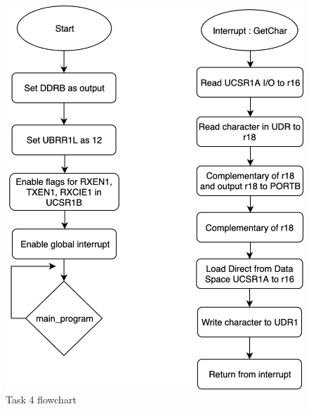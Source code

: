 \documentclass[a4paper,12pt]{article}
\begin{document}
\break
\begin{figure}
\begin{center}
\includegraphics[width=\textwidth/2 ]{flowchart/task5_flowchart.png}
\end{center}
\caption{Task 4 flowchart}
\label{task4}
\end{figure}

\break 



\end{document}
